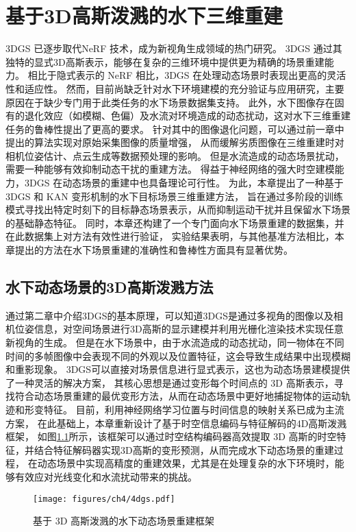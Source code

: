 
\chapter{基于3D高斯泼溅的水下三维重建}
3DGS\cite{3DGS} 已逐步取代NeRF\cite{nerf} 技术，成为新视角生成领域的热门研究。
3DGS 通过其独特的显式3D高斯表示，能够在复杂的三维环境中提供更为精确的场景重建能力。
相比于隐式表示的 NeRF 相比，3DGS 在处理动态场景时表现出更高的灵活性和适应性。
然而，目前尚缺乏针对水下环境建模的充分验证与应用研究，主要原因在于缺少专门用于此类任务的水下场景数据集支持。
此外，水下图像存在固有的退化效应（如模糊、色偏）及水流对环境造成的动态扰动，这对水下三维重建任务的鲁棒性提出了更高的要求。
针对其中的图像退化问题，可以通过前一章中提出的算法实现对原始采集图像的质量增强，
从而缓解劣质图像在三维重建时对相机位姿估计、点云生成等数据预处理的影响。
但是水流造成的动态场景扰动，需要一种能够有效抑制动态干扰的重建方法。
得益于神经网络的强大时空建模能力，3DGS 在动态场景的重建中也具备理论可行性。
为此，本章提出了一种基于 3DGS 和 KAN \cite{kan}变形机制的水下目标场景三维重建方法，
旨在通过多阶段的训练模式寻找出特定时刻下的目标静态场景表示，从而抑制运动干扰并且保留水下场景的基础静态特征。
同时，本章还构建了一个专门面向水下场景重建的数据集，并在此数据集上对方法有效性进行验证，
实验结果表明，与其他基准方法相比，本章提出的方法在水下场景重建的准确性和鲁棒性方面具有显著优势。

\section{水下动态场景的3D高斯泼溅方法} \label{sec:4dgs}
通过第二章中介绍3DGS的基本原理，可以知道3DGS是通过多视角的图像以及相机位姿信息，对空间场景进行3D高斯的显示建模并利用光栅化渲染技术实现任意新视角的生成。
但是在水下场景中，由于水流造成的动态扰动，同一物体在不同时间的多帧图像中会表现不同的外观以及位置特征，这会导致生成结果中出现模糊和重影现象。
3DGS可以直接对场景信息进行显式表示，这也为动态场景建模提供了一种灵活的解决方案，
其核心思想是通过变形每个时间点的 3D 高斯表示，寻找符合动态场景重建的最优变形方法，从而在动态场景中更好地捕捉物体的运动轨迹和形变特征。
目前，利用神经网络学习位置与时间信息的映射关系已成为主流方案，
在此基础上，本章重新设计了基于时空信息编码与特征解码的4D高斯泼溅\cite{4DGS}框架，
如图\ref{img:4dgs}所示，该框架可以通过时空结构编码器高效提取 3D 高斯的时空特征，并结合特征解码器实现3D高斯的变形预测，从而完成水下动态场景的重建过程，
在动态场景中实现高精度的重建效果，尤其是在处理复杂的水下环境时，能够有效应对光线变化和水流扰动带来的挑战。
\begin{figure}[ht]
    \centering
    \texttt{[image: figures/ch4/4dgs.pdf]}
    \vspace{4mm}
    \caption{基于 3D 高斯泼溅的水下动态场景重建框架}
    \label{img:4dgs}
    \vspace{4mm}
\end{figure}

